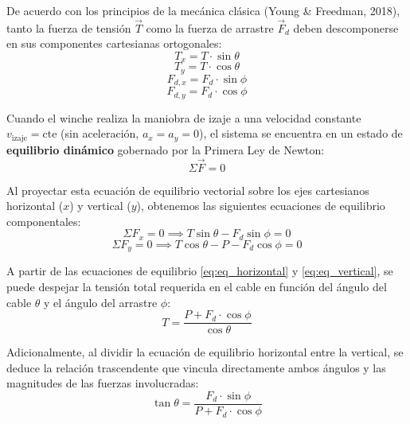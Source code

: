 \documentclass[11pt,a4paper]{article}
\begin{document}
De acuerdo con los principios de la mecánica clásica (Young \& Freedman, 2018), tanto la fuerza de tensión $\vec{T}$ como la fuerza de arrastre $\vec{F}_d$ deben descomponerse en sus componentes cartesianas ortogonales:
\begin{equation}\label{eq:decomp_tx}
T_x = T \cdot \sin\theta
\end{equation}
\begin{equation}\label{eq:decomp_ty}
T_y = T \cdot \cos\theta
\end{equation}
\begin{equation}\label{eq:decomp_fdx}
F_{d,x} = F_d \cdot \sin\phi
\end{equation}
\begin{equation}\label{eq:decomp_fdy}
F_{d,y} = F_d \cdot \cos\phi
\end{equation}

Cuando el winche realiza la maniobra de izaje a una velocidad constante $v_{\text{izaje}} = \text{cte}$ (sin aceleración, $a_x = a_y = 0$), el sistema se encuentra en un estado de \textbf{equilibrio dinámico} gobernado por la Primera Ley de Newton:
\begin{equation}\label{eq:eq_dinamico}
\Sigma \vec{F} = 0
\end{equation}

Al proyectar esta ecuación de equilibrio vectorial sobre los ejes cartesianos horizontal ($x$) y vertical ($y$), obtenemos las siguientes ecuaciones de equilibrio componentales:
\begin{equation}\label{eq:eq_horizontal}
\Sigma F_x = 0 \implies T\sin\theta - F_d\sin\phi = 0
\end{equation}
\begin{equation}\label{eq:eq_vertical}
\Sigma F_y = 0 \implies T\cos\theta - P - F_d\cos\phi = 0
\end{equation}

A partir de las ecuaciones de equilibrio \eqref{eq:eq_horizontal} y \eqref{eq:eq_vertical}, se puede despejar la tensión total requerida en el cable en función del ángulo del cable $\theta$ y el ángulo del arrastre $\phi$:
\begin{equation}\label{eq:tension_con_angulo}
T = \frac{P + F_d \cdot \cos\phi}{\cos\theta}
\end{equation}

Adicionalmente, al dividir la ecuación de equilibrio horizontal entre la vertical, se deduce la relación trascendente que vincula directamente ambos ángulos y las magnitudes de las fuerzas involucradas:
\begin{equation}\label{eq:angulos_relacion}
\tan\theta = \frac{F_d \cdot \sin\phi}{P + F_d \cdot \cos\phi}
\end{equation}
\end{document}
